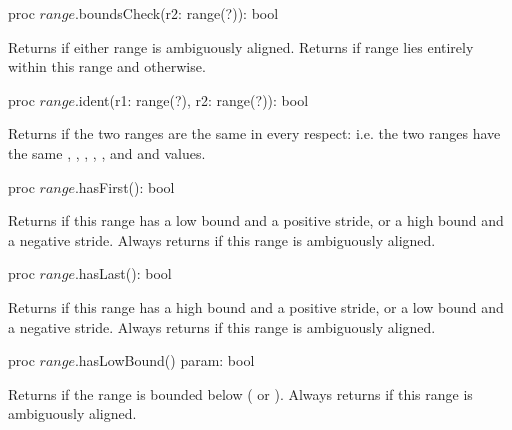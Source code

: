 \begin{protohead}
proc $range$.boundsCheck(r2: range(?)): bool
\end{protohead}
\begin{protobody}
Returns  if either range is ambiguously aligned.
Returns  if range  lies entirely within this range
and  otherwise.  
\end{protobody}

\begin{protohead}
proc $range$.ident(r1: range(?), r2: range(?)): bool
\end{protohead}
\begin{protobody}
Returns  if the two ranges are the same in every respect: i.e. the
two ranges have the same ,
, , , ,  and
 and  values.
\end{protobody}

\begin{protohead}
proc $range$.hasFirst(): bool
\end{protohead}
\begin{protobody}
Returns  if this range has a low bound and a positive stride, or a high
bound and a negative stride.
Always returns  if this range is ambiguously aligned.
\end{protobody}

\begin{protohead}
proc $range$.hasLast(): bool
\end{protohead}
\begin{protobody}
Returns  if this range has a high bound and a positive stride, or a low
bound and a negative stride.
Always returns  if this range is ambiguously aligned.
\end{protobody}

\begin{protohead}
proc $range$.hasLowBound() param: bool
\end{protohead}
\begin{protobody}
Returns  if the range is bounded below ( or ).
Always returns  if this range is ambiguously aligned.
\end{protobody}

